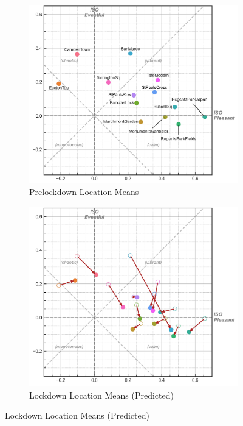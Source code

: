 \begin{figure}[!hp]
  \centering
  \begin{subfigure}[]{.7\textwidth}
    \centering
    \caption{Prelockdown Location Means \label{fig:prelockdownCircCoordsA}}
    \includegraphics[width=\textwidth]{Figures/LockdownCircCoordsA.jpg}
  \end{subfigure}
  \hfill

  \begin{subfigure}{.7\textwidth}
    \centering
    \caption{Lockdown Location Means (Predicted) \label{fig:lockdownCircCoordsB}}
    \includegraphics[width=\textwidth]{Figures/LockdownCircCoordsB.jpg}
  \end{subfigure}
  \hfill
  

\end{figure}
